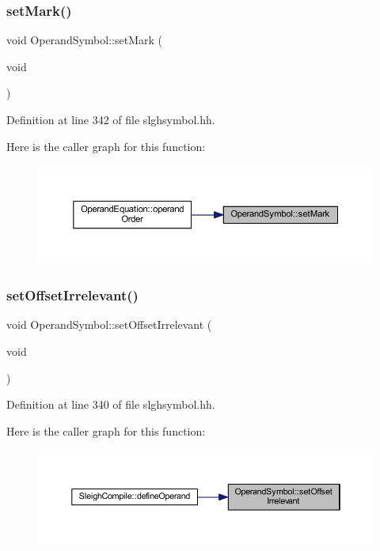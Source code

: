 \subsubsection{\texorpdfstring{setMark()}{setMark()}}
{\footnotesize\ttfamily void Operand\+Symbol\+::set\+Mark (\begin{DoxyParamCaption}\item[{void}]{ }\end{DoxyParamCaption})\hspace{0.3cm}{\ttfamily [inline]}}



Definition at line 342 of file slghsymbol.\+hh.

Here is the caller graph for this function\+:
\nopagebreak
\begin{figure}[H]
\begin{center}
\leavevmode
\includegraphics[width=350pt]{class_operand_symbol_a0b306a07c71c5d101a160c776cccb961_icgraph}
\end{center}
\end{figure}
\mbox{\label{class_operand_symbol_af922e31dad656d8611d23e1e816b9279}} 
\subsubsection{\texorpdfstring{setOffsetIrrelevant()}{setOffsetIrrelevant()}}
{\footnotesize\ttfamily void Operand\+Symbol\+::set\+Offset\+Irrelevant (\begin{DoxyParamCaption}\item[{void}]{ }\end{DoxyParamCaption})\hspace{0.3cm}{\ttfamily [inline]}}



Definition at line 340 of file slghsymbol.\+hh.

Here is the caller graph for this function\+:
\nopagebreak
\begin{figure}[H]
\begin{center}
\leavevmode
\includegraphics[width=350pt]{class_operand_symbol_af922e31dad656d8611d23e1e816b9279_icgraph}
\end{center}
\end{figure}


